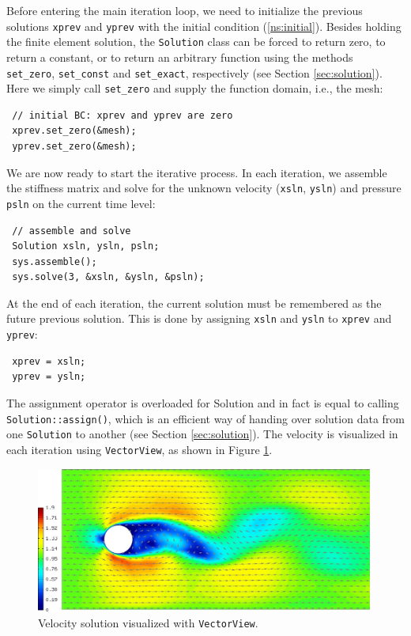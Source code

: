 Before entering the main iteration loop, we need to initialize the previous solutions 
{\tt xprev} and {\tt yprev} with the initial condition 
(\ref{ns:initial}). Besides holding the finite element solution, the {\tt Solution} class
can be forced to return zero, to return a constant, or to return an arbitrary function
using the methods \verb"set_zero", \verb"set_const" and \verb"set_exact", respectively
(see Section \ref{sec:solution}). Here we simply call \verb"set_zero" and supply the
function domain, i.e., the mesh:
\begin{lstlisting}
 // initial BC: xprev and yprev are zero
 xprev.set_zero(&mesh);
 yprev.set_zero(&mesh);
\end{lstlisting}
 
We are now ready to start the iterative process. In each iteration, we assemble the
stiffness matrix and solve for the unknown velocity ({\tt xsln}, {\tt ysln}) and
pressure {\tt psln} on the current time level:
\begin{lstlisting}
 // assemble and solve
 Solution xsln, ysln, psln;
 sys.assemble();
 sys.solve(3, &xsln, &ysln, &psln);
\end{lstlisting}

At the end of each iteration, the current solution must be remembered as the future
previous solution. This is done by assigning {\tt xsln} and {\tt ysln} to {\tt xprev}
and {\tt yprev}:
\begin{lstlisting}
 xprev = xsln;
 yprev = ysln;
\end{lstlisting}
The assignment operator is overloaded for Solution and in fact is equal to calling
{\tt Solution::assign()}, which is an efficient way of handing over solution data from
one {\tt Solution} to another (see Section \ref{sec:solution}).
The velocity is visualized in each iteration using {\tt VectorView}, as shown
in Figure \ref{fig:velocity}.

\begin{figure}[ht]
  \medskip \centering
  \includegraphics[width=0.99\textwidth]{img/velocity.jpg}
  \caption{Velocity solution visualized with {\tt VectorView}.}
  \label{fig:velocity}
\end{figure}


